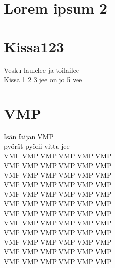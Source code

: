 \documentclass[a4paper,12pt,oneside]{lauluvihko}
\begin{document}
\begin{multicols}{2}
   \section{Lorem ipsum 2}
   \blindtext %

   \newpage %

   \section{Kissa123}
   Vesku laulelee ja toilailee \\
   Kissa 1 2 3 jee on jo 5 vee \\
   \vfil %
   
   \columnbreak %

   \section{VMP}
   Isän faijan VMP \\
   pyörät pyörii vittu jee \\
   VMP VMP VMP VMP VMP VMP \\
   VMP VMP VMP VMP VMP VMP \\
   VMP VMP VMP VMP VMP VMP \\
   VMP VMP VMP VMP VMP VMP \\
   VMP VMP VMP VMP VMP VMP \\
   VMP VMP VMP VMP VMP VMP \\
   VMP VMP VMP VMP VMP VMP \\
   VMP VMP VMP VMP VMP VMP \\
   VMP VMP VMP VMP VMP VMP \\
   VMP VMP VMP VMP VMP VMP \\
   VMP VMP VMP VMP VMP VMP \\
   VMP VMP VMP VMP VMP VMP 
\end{multicols}
\end{document}
